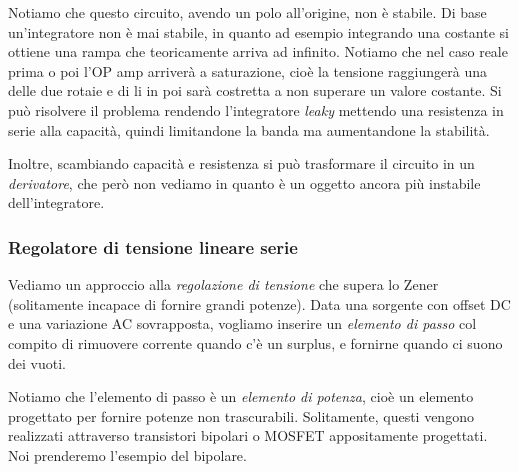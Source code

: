 \documentclass[a4paper,11pt]{article}
\begin{document}
Notiamo che questo circuito, avendo un polo all'origine, non è stabile. Di base un'integratore non è mai stabile, in quanto ad esempio integrando una costante si ottiene una rampa che teoricamente arriva ad infinito.
Notiamo che nel caso reale prima o poi l'OP amp arriverà a saturazione, cioè la tensione raggiungerà una delle due rotaie e di li in poi sarà costretta a non superare un valore costante. Si può risolvere il problema rendendo l'integratore \textit{leaky} mettendo una resistenza in serie alla capacità, quindi limitandone la banda ma aumentandone la stabilità.

Inoltre, scambiando capacità e resistenza si può trasformare il circuito in un \textit{derivatore}, che però non vediamo in quanto è un oggetto ancora più instabile dell'integratore. 

\subsubsection{Regolatore di tensione lineare serie}
Vediamo un approccio alla \textit{regolazione di tensione} che supera lo Zener (solitamente incapace di fornire grandi potenze). Data una sorgente con offset DC e una variazione AC sovrapposta, vogliamo inserire un \textit{elemento di passo} col compito di rimuovere corrente quando c'è un surplus, e fornirne quando ci suono dei vuoti.
\begin{center}
\end{center}

Notiamo che l'elemento di passo è un \textit{elemento di potenza}, cioè un elemento progettato per fornire potenze non trascurabili. Solitamente, questi vengono realizzati attraverso transistori bipolari o MOSFET appositamente progettati. Noi prenderemo l'esempio del bipolare. 
\end{document}

